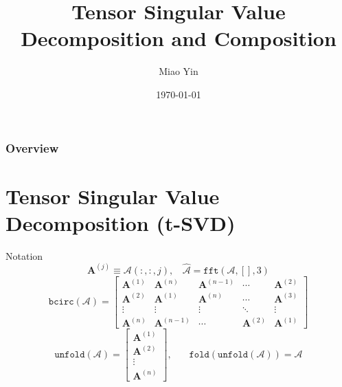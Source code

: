 \documentclass{beamer}
\title[t-SVD]{Tensor Singular Value Decomposition and Composition} %
\author{Miao Yin} %
\institute[] %
{
Rutgers University \\ %
\medskip
\textit{miao.yin@rutgers.edu} %
}
\date{\today} %
\begin{document}
\begin{frame}
\titlepage %
\end{frame}

\begin{frame}
\frametitle{Overview} %
\tableofcontents %
\end{frame}


\section{Tensor Singular Value Decomposition (t-SVD)} %

\begin{frame}{Notation}
$$
\mathbf{A}^{(j)}\equiv\mathcal{A}(:,:,j),~~~~\hat{\mathcal{A}} = \texttt{fft}(\mathcal{A}, [], 3)
$$
$$
\texttt{bcirc}(\mathcal{A})=\left[
  \begin{array}{ccccc}
   \mathbf{A}^{(1)} & \mathbf{A}^{(n)} & \mathbf{A}^{(n-1)} & \cdots & \mathbf{A}^{(2)} \\
   \mathbf{A}^{(2)} & \mathbf{A}^{(1)} & \mathbf{A}^{(n)} & \cdots & \mathbf{A}^{(3)} \\
   \vdots & \vdots & \vdots & \ddots & \vdots \\
    \mathbf{A}^{(n)} & \mathbf{A}^{(n-1)} & \cdots & \mathbf{A}^{(2)} & \mathbf{A}^{(1)}
  \end{array}
  \right]
$$
$$
\texttt{unfold}(\mathcal{A})=\left[
  \begin{matrix}
    \mathbf{A}^{(1)} \\
    \mathbf{A}^{(2)} \\
    \vdots \\
    \mathbf{A}^{(n)}
  \end{matrix}
\right], ~~~~~~~~\texttt{fold}(\texttt{unfold}(\mathcal{A}))=\mathcal{A}
$$
\end{frame}
\end{document}

